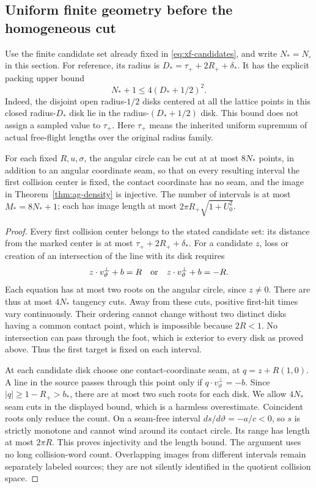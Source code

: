 \subsection{Uniform finite geometry before the homogeneous cut}
Use the finite candidate set already fixed in
\eqref{eq:xf-candidates}, and write $N_*=N_\circ$ in this section.
For reference, its radius is $D_*=\tau_++2R_++\delta_*$. It has the
explicit packing upper bound
\begin{equation}\label{eq:ag-packing}
 N_*+1\le4(D_*+1/2)^2.
\end{equation}
Indeed, the disjoint open radius-$1/2$ disks centered at all the
lattice points in this closed radius-$D_*$ disk lie in the
radius-$(D_*+1/2)$ disk. This bound does not assign a sampled value
to $\tau_+$. Here $\tau_+$ means the inherited uniform supremum of
actual free-flight lengths over the original radius family.

\begin{lemma}
\label{lem:ag-branches}
For each fixed $R,u,\sigma$, the angular circle can be cut at at
most $8N_*$ points, in addition to an angular coordinate seam, so
that on every resulting interval the first collision center is
fixed, the contact coordinate has no seam, and the image in
Theorem~\ref{thm:ag-density} is injective. The number of intervals
is at most $M_*=8N_*+1$; each has image length at most
$2\pi R_+\sqrt{1+U_0^2}$.
\end{lemma}
\begin{proof}
Every first collision center belongs to the stated candidate set:
its distance from the marked center is at most
$\tau_++2R_++\delta_*$. For a candidate $z$, loss or creation of
an intersection of the line with its disk requires
\[
                 z\cdot v_\vartheta^\perp+b=R
        \quad\hbox{or}\quad z\cdot v_\vartheta^\perp+b=-R.
\]
Each equation has at most two roots on the angular circle, since
$z\ne0$. There are thus at most $4N_*$ tangency cuts. Away from
these cuts, positive first-hit times vary continuously. Their
ordering cannot change without two distinct disks having a common
contact point, which is impossible because $2R<1$. No intersection
can pass through the foot, which is exterior to every disk as
proved above. Thus the first target is fixed on each interval.

At each candidate disk choose one contact-coordinate seam, at
$q=z+R(1,0)$. A line in the source passes through this point only
if $q\cdot v_\vartheta^\perp=-b$. Since
$|q|\ge1-R_+>b_*$, there are at most two such roots for each disk.
We allow $4N_*$ seam cuts in the displayed bound, which is a
harmless overestimate. Coincident roots only reduce the count.
On a seam-free interval $ds/d\vartheta=-a/c<0$, so $s$ is strictly
monotone and cannot wind around its contact circle. Its range has
length at most $2\pi R$. This proves injectivity and the length
bound. The argument uses no long collision-word count. Overlapping
images from different intervals remain separately labeled sources;
they are not silently identified in the quotient collision space.
\end{proof}

